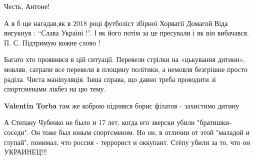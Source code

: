 \begin{itemize}
 
Честь, Антоне!

 

А я б ще нагадав,як в 2018 році футболіст збірної Хорватії Домагой Віда
вигукнув : \enquote{Слава Україні !}. І як його потім за це пресували і як він
вибачався. П. С. Підтримую кожне слово !


 

Багато хто проявився в цій ситуації. Перевели стрілки на «цькування дитини»,
мовляв, сатрапи все перевели в площину політики, а немовля безгрішне просто
раділа. Чиста маніпуляція. Інша справа, що давно треба проводити зі
спортсменами лікбез на цю тему.

\begin{itemize}
 
\textbf{Valentin Torba} там же коброю піднявся борис філатов - захистимо дитину
\end{itemize}

 

А Степану Чубенко не было и 17 лет, когда его зверски убили "братишки-соседи".
Он тоже был юным спортсменом. Но он, в отличии от этой "маладой и глупай",
понимал, что россия - террорист и оккупант. Стёпу убили за то, что он
УКРАИНЕЦ!!!



\end{itemize}
